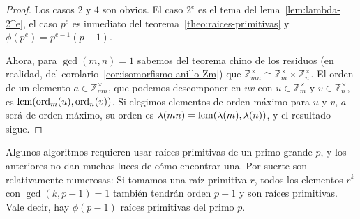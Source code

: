   \begin{proof}
    Los casos \(2\) y \(4\) son obvios.
    El caso \(2^e\) es el tema del lema~\ref{lem:lambda-2^e},
    el caso \(p^e\)
    es inmediato del teorema~\ref{theo:raices-primitivas}
    y \(\phi(p^e) = p^{e - 1} (p - 1)\).

    Ahora,
    para \(\gcd(m, n) = 1\)
    sabemos del teorema chino de los residuos%
    (en realidad,
     del corolario~\ref{cor:isomorfismo-anillo-Zm})%
    que \(\mathbb{Z}^\times_{m n}
	    \cong \mathbb{Z}^\times_m \times \mathbb{Z}^\times_n\).
    El orden de un elemento \(a \in \mathbb{Z}^\times_{m n}\),
    que podemos descomponer en \(u v\)
    con \(u \in \mathbb{Z}^\times_m\)
    y \(v \in \mathbb{Z}^\times_n\),
    es \(\operatorname{lcm}(\operatorname{ord}_m(u), \operatorname{ord}_n(v))\).
    Si elegimos elementos de orden máximo para \(u\) y \(v\),
    \(a\) será de orden máximo,
    su orden es \(\lambda(m n) = \operatorname{lcm}(\lambda(m), \lambda(n))\),
    y el resultado sigue.
  \end{proof}

  Algunos algoritmos
  requieren usar raíces primitivas de un primo grande \(p\),%
  y los anteriores no dan muchas luces de cómo encontrar una.
  Por suerte son relativamente numerosas:
  Si tomamos una raíz primitiva \(r\),
  todos los elementos \(r^k\) con \(\gcd(k, p - 1) = 1\)
  también tendrán orden \(p - 1\) y son raíces primitivas.
  Vale decir,
  hay \(\phi(p - 1)\) raíces primitivas del primo \(p\).

